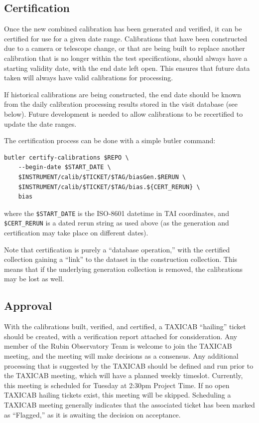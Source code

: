 \documentclass[DM,authoryear,toc]{lsstdoc}
\begin{document}
\subsection{Certification}

Once the new combined calibration has been generated and verified, it can be certified for use for a given date range.
Calibrations that have been constructed due to a camera or telescope change, or that are being built to replace another calibration that is no longer within the test specifications, should always have a starting validity date, with the end date left open.
This ensures that future data taken will always have valid calibrations for processing.

If historical calibrations are being constructed, the end date should be known from the daily calibration processing results stored in the visit database (see below).
Future development is needed to allow calibrations to be recertified to update the date ranges.

The certification process can be done with a simple butler command:
\begin{verbatim}
butler certify-calibrations $REPO \
    --begin-date $START_DATE \
    $INSTRUMENT/calib/$TICKET/$TAG/biasGen.$RERUN \
    $INSTRUMENT/calib/$TICKET/$TAG/bias.${CERT_RERUN} \
    bias
\end{verbatim}
where the \verb|$START_DATE| is the ISO-8601 datetime in TAI coordinates, and \verb|$CERT_RERUN| is a dated rerun string as used above (as the generation and certification may take place on different dates).

Note that certification is purely a ``database operation,'' with the certified collection gaining a ``link'' to the dataset in the construction collection.
This means that if the underlying generation collection is removed, the calibrations may be lost as well.

\subsection{Approval}

With the calibrations built, verified, and certified, a TAXICAB ``hailing'' ticket should be created, with a verification report attached for consideration.
Any member of the Rubin Observatory Team is welcome to join the TAXICAB meeting, and the meeting will make decisions as a consensus.
Any additional processing that is suggested by the TAXICAB should be defined and run prior to the TAXICAB meeting, which will have a planned weekly timeslot.
Currently, this meeting is scheduled for Tuesday at 2:30pm Project Time.
If no open TAXICAB hailing tickets exist, this meeting will be skipped.
Scheduling a TAXICAB meeting generally indicates that the associated ticket has been marked as ``Flagged,'' as it is awaiting the decision on acceptance.
\end{document}

